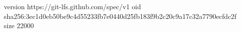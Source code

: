 version https://git-lfs.github.com/spec/v1
oid sha256:3ec1d0eb50be9c4d55233fb7e0440d25fb183f9b2c20c9a17c32a7790ecfdc2f
size 22000

